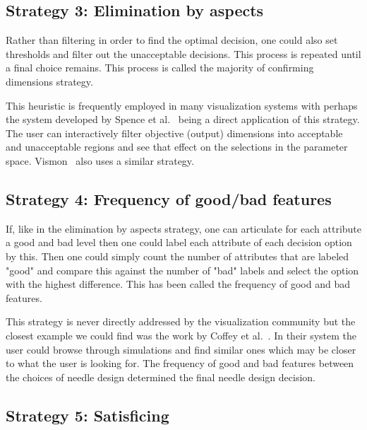 \subsection{Strategy 3: Elimination by aspects}\label{elimination-by-aspects}

Rather than filtering in order to find the optimal decision, one could
also set thresholds and filter out the unacceptable decisions.  This process
is repeated until a final choice remains. This process is called
the majority of confirming dimensions strategy. 

This heuristic is frequently employed in many visualization systems with
perhaps the system developed by Spence et al.~\citep{Spence:1995} being a
direct application of this strategy. The user can interactively filter
objective (output) dimensions into acceptable and unacceptable regions and
see that effect on the selections in the parameter space. 
Vismon~\citep{Booshehrian:2012} also uses a similar strategy.

\subsection{Strategy 4: Frequency of good/bad features}
\label{frequency-of-goodbad-features}

If, like in the elimination by aspects strategy, one can articulate for
each attribute a good and bad level then one could label each attribute
of each decision option by this. Then one could simply count the number of
attributes that are labeled "good" and compare this against the number of
"bad" labels and select the option with the highest difference. This has
been called the frequency of good and bad features.

This strategy is never directly addressed by the visualization community
but the closest example we could find was the work by 
Coffey et al.~\citep{Coffey:2013}. In their system the user could browse
through simulations and find similar ones which may be closer to what
the user is looking for. The frequency of good and bad features between the
choices of needle design determined the final needle design decision.

\subsection{Strategy 5: Satisficing}\label{satisficing}

